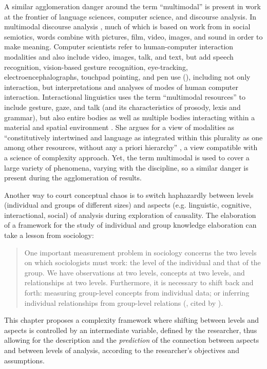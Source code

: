 \documentclass[output=paper]{langscibook}
\begin{document}
A similar agglomeration danger around the term “multimodal” is present in work at the frontier of language sciences, computer science, and discourse analysis. In multimodal discourse analysis \citep{Paltridge2012}, much of which is based on work from \citet{Halliday1978} in social semiotics, words combine with pictures, film, video, images, and sound in order to make meaning. Computer scientists refer to human-computer interaction modalities and also include video, images, talk, and text, but add speech recognition, vision-based gesture recognition, eye-tracking, electroencephalographs, touchpad pointing, and pen use (\citealt{Oviatt2002,SharmaEtAl1998}), including not only interaction, but interpretations and analyses of modes of human computer interaction. Interactional linguistics uses the term “multimodal resources” to include gesture, gaze, and talk (and its characteristics of prosody, lexis and grammar), but also entire bodies as well as multiple bodies interacting within a material and spatial environment \citep{Mondada2016}. She argues for a view of modalities as “constitutively intertwined and language as integrated within this plurality as one among other resources, without any a priori hierarchy” \parencites[338]{Mondada2016}, a view compatible with a science of complexity approach. Yet, the term multimodal is used to cover a large variety of phenomena, varying with the discipline, so a similar danger is present during the agglomeration of results.

Another way to court conceptual chaos is to switch haphazardly between levels (individual and groups of different sizes) and aspects (e.g. linguistic, cognitive, interactional, social) of analysis during exploration of causality.  The elaboration of a framework for the study of individual and group knowledge elaboration can take a lesson from sociology: 

\begin{quote}
One important measurement problem in sociology concerns the two levels on which sociologists must work: the level of the individual and that of the group. We have observations at two levels, concepts at two levels, and relationships at two levels. Furthermore, it is necessary to shift back and forth: measuring group-level concepts from individual data; or inferring individual relationships from group-level relations (\citealt[84]{Coleman1964}, cited by \citealt[141]{Singer1968}).
\end{quote}

This chapter proposes a complexity framework where shifting between levels and aspects is controlled by an intermediate variable, defined by the researcher, thus allowing for the description and the \textit{prediction} of the connection between aspects and between levels of analysis, according to the researcher’s objectives and assumptions.
\end{document}
